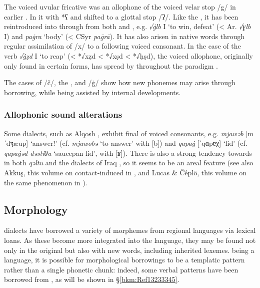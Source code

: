 \documentclass[output=paper]{langsci/langscibook}
\begin{document}
The voiced uvular fricative was an allophone of the voiced velar stop /g/ in earlier . In  it  with *ʕ and shifted to a glottal stop /ʔ/. Like the , it has been reintroduced into  through  from both  and  , e.g. \textit{√\.glb} I ‘to win, defeat’ (< Ar. \textit{√ɣlb} I) and \textit{pa\.gra} ‘body’ (< CSyr \textit{pa\={g}rā}). It has also arisen in native words through regular assimilation of /x/ to a following voiced consonant. In the case of the verb \textit{√\.gẓd} I ‘to reap’ (< *√xẓd < *√xṣd  < *√ḥṣd), the voiced allophone, originally only found in certain forms, has spread by  throughout the paradigm \citep[20]{Coghill2004}.

The cases of /č/, the , and /\.g/ show how new phonemes may arise through borrowing, while being assisted by internal developments.

\subsubsection{Allophonic sound alterations}

Some  dialects, such as  Alqosh \citep[27]{Coghill2004}, exhibit final  of voiced consonants, e.g. \textit{mjāwəb} [mˈdʒæup] ‘answer!’ (cf. \textit{mjawobə} ‘to answer’ with [b]) and \textit{qapa\.g} [ˈqɑpɐχ] ‘lid’ (cf. \textit{qapa\.gəd-dəstiθa} ‘saucepan lid’, with [ʁ]). There is also a strong tendency towards  in both \textit{qəltu}  \citep[98]{Jastrow1978} and the  dialects of Iraq \citep[49]{MacKenzie1961}, so it seems to be an areal feature (see also Akkuş, this volume on contact-induced  in  , and Lucas \& Čéplö, this volume on the same phenomenon in ).

\subsection{Morphology}

 dialects have borrowed a variety of morphemes from regional languages via lexical loans. As these become more integrated into the language, they may be found not only in the original  but also with new words, including inherited lexemes.  being a  language, it is possible for morphological borrowings to be a templatic pattern rather than a single phonetic chunk: indeed, some verbal  patterns have been borrowed from , as will be shown in §\ref{bkm:Ref13233345}.
\end{document}
